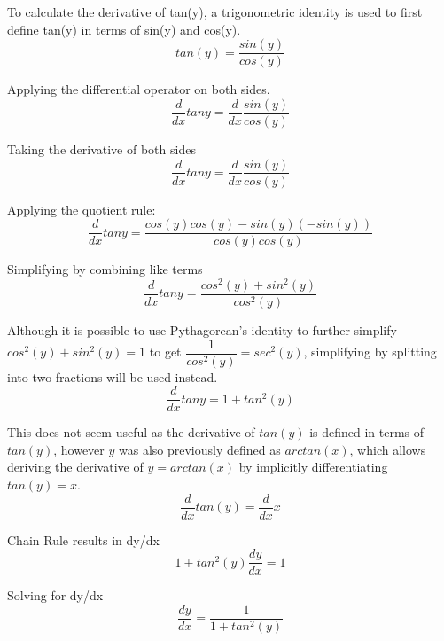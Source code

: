 \documentclass[12pt, titlepage]{article}
\begin{document}
To calculate the derivative of tan(y), a trigonometric identity is used to first define tan(y) in terms of sin(y) and cos(y).
\begin{equation*}
 tan(y) = \frac{sin(y)}{cos(y)}
\end{equation*}

Applying the differential operator on both sides.
\begin{equation*}
  \frac{d}{dx} tany = \frac{d}{dx} \frac{sin(y)}{cos(y)}
\end{equation*}

Taking the derivative of both sides
\begin{equation*}
  \frac{d}{dx} tany = \frac{d}{dx} \frac{sin(y)}{cos(y)}
\end{equation*}

Applying the quotient rule:
\begin{equation*}
  \frac{d}{dx} tany = \frac{cos(y)cos(y) - sin(y)(-sin(y))}{cos(y)cos(y)}
\end{equation*}

Simplifying by combining like terms
\begin{equation*}
  \frac{d}{dx} tany = \frac{cos^{2}(y) + sin^{2}(y)}{cos^{2}(y)}
\end{equation*}

Although it is possible to use Pythagorean's identity to further simplify \(cos^{2}(y) + sin^{2}(y) = 1\) to get \(\dfrac{1}{cos^{2}(y)} = sec^{2}(y)\), simplifying by splitting into two fractions will be used instead. 
\begin{equation*}
  \frac{d}{dx} tany = 1 + tan^{2}(y)
\end{equation*}

This does not seem useful as the derivative of \(tan(y)\) is defined in terms of \(tan(y)\), however \(y\) was also previously defined as \(arctan(x)\), which allows deriving the derivative of \(y = arctan(x)\) by implicitly differentiating \(tan(y) = x\).
\begin{equation*}
 \frac{d}{dx} tan(y) = \frac{d}{dx} x
\end{equation*}

Chain Rule results in dy/dx
\begin{equation*}
 1 + tan^{2}(y) \frac{dy}{dx}  = 1
\end{equation*}

Solving for dy/dx
\begin{equation*}
 \frac{dy}{dx}  = \frac{1}{1 + tan^{2}(y)}
\end{equation*}
\end{document}
